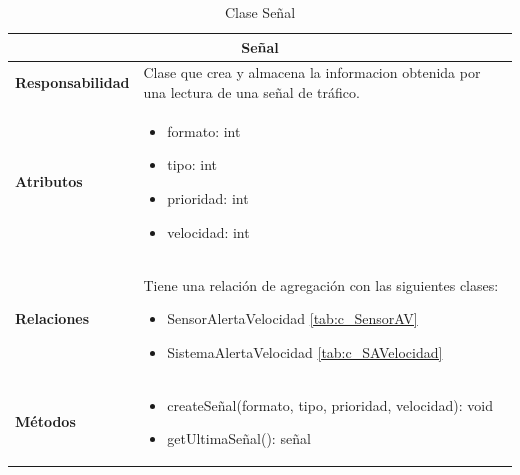 \begin{table}[H]
\begin{center}
\begin{tabular}{p{} p{11cm}}
\multicolumn{2}{c}{\textbf{Señal} } \\ \hline \hline
\textbf{Responsabilidad} &  Clase que crea y almacena la informacion obtenida por una lectura de una señal de tráfico. \\ \hline
\textbf{Atributos} & \begin{itemize}
                      \item formato: int
                      \item tipo: int
                      \item prioridad: int
                      \item velocidad: int

                    \end{itemize}\\ \hline
\textbf{Relaciones} &

                      \par Tiene una relación de agregación con las siguientes clases:
                      \begin{itemize}
                        \item SensorAlertaVelocidad \ref{tab:c_SensorAV}
                        \item SistemaAlertaVelocidad \ref{tab:c_SAVelocidad}
                      \end{itemize}



                      \\ \hline

\textbf{Métodos} &  \begin{itemize}
                      \item createSeñal(formato, tipo, prioridad, velocidad): void
                      \item getUltimaSeñal(): señal
                    \end{itemize}\\ \hline
\end{tabular}
\caption{Clase Señal}
\label{tab:c_senal}
\end{center}
\end{table}










